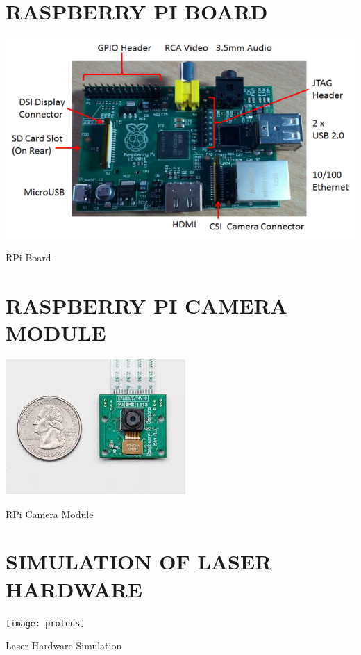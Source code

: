 \documentclass[12pt, a4paper]{article}
\begin{document}
\begin{appendices}
\section{RASPBERRY PI BOARD}
\begin{appendixfig}
\centering
\includegraphics[scale=0.90]{RPiModelB.png}
\caption{RPi Board}
\label{}
\end{appendixfig}
\newpage
\section{RASPBERRY PI CAMERA MODULE}
\begin{appendixfig}
\includegraphics[scale=1.00]{index.jpeg}
\caption{RPi Camera Module}
\label{}
\end{appendixfig}
\newpage
\section{SIMULATION OF LASER HARDWARE}
\begin{appendixfig}
\centering
\texttt{[image: proteus]}
\caption{Laser Hardware Simulation}
\label{}
\end{appendixfig}
\newpage

\end{appendices}
\end{document}
